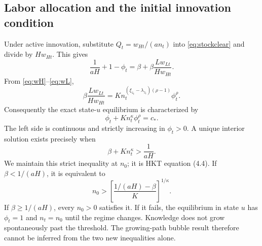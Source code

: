 \documentclass[11pt,a4paper]{article}
\begin{document}
\subsection{Labor allocation and the initial innovation condition}
Under active innovation, substitute $Q_t=w_{Ht}/(an_t)$ into
\eqref{eq:stockclear} and divide by $Hw_{Ht}$. This gives
\begin{equation}
\frac1{aH}+1-\phi_t=\beta+\beta\frac{Lw_{Lt}}{Hw_{Ht}}.\label{eq:clearingratio}
\end{equation}
From \eqref{eq:wH}--\eqref{eq:wL},
\begin{equation}
\beta\frac{Lw_{Lt}}{Hw_{Ht}}
 =K n_t^{(\xi_{z_t}-\lambda_{z_t})(\rho-1)}\phi_t^\rho.
\end{equation}
Consequently the exact state-$u$ equilibrium is characterized by
\begin{equation}
\boxed{\phi_t+K n_t^\kappa\phi_t^\rho=c_*.}\label{eq:allocation}
\end{equation}
The left side is continuous and strictly increasing in $\phi_t>0$. A unique
interior solution exists precisely when
\begin{equation}
\boxed{\beta+K n_t^\kappa>\frac1{aH}.}\label{eq:innovation}
\end{equation}
We maintain this strict inequality at $n_0$; it is HKT equation (4.4).
If $\beta<1/(aH)$, it is equivalent to
\begin{equation}
n_0>\left[\frac{1/(aH)-\beta}{K}\right]^{1/\kappa}.
\end{equation}
If $\beta\geq1/(aH)$, every $n_0>0$ satisfies it. If it fails, the equilibrium
in state $u$ has $\phi_t=1$ and $n_t=n_0$ until the regime changes. Knowledge
does not grow spontaneously past the threshold. The growing-path bubble result
therefore cannot be inferred from the two new inequalities alone.
\end{document}
